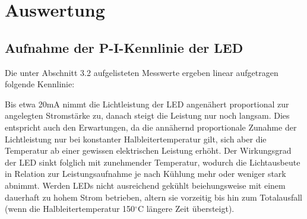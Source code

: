 \documentclass[bigchapter,colorback,accentcolor=tud4b,linedtoc,11pt]{tudreport}
\begin{document}
\chapter{Auswertung}
\section{Aufnahme der P-I-Kennlinie der LED}

Die unter Abschnitt 3.2 aufgelisteten Messwerte ergeben linear aufgetragen folgende Kennlinie:

\begin{center}
\begin{figure}[h]
\end{figure}
\end{center}

Bis etwa 20mA nimmt die Lichtleistung der LED angenähert proportional zur angelegten Stromstärke zu, danach steigt die Leistung nur noch langsam. Dies entspricht auch den Erwartungen, da die annähernd proportionale Zunahme der Lichtleistung nur bei konstanter Halbleitertemperatur gilt, sich aber die Temperatur ab einer gewissen elektrischen Leistung erhöht. Der Wirkungsgrad der LED sinkt folglich mit zunehmender Temperatur, wodurch die Lichtausbeute in Relation zur Leistungsaufnahme je nach Kühlung mehr oder weniger stark abnimmt. Werden LEDs nicht ausreichend gekühlt beiehungsweise mit einem dauerhaft zu hohem Strom betrieben, altern sie vorzeitig bis hin zum Totalausfall (wenn die Halbleitertemperatur 150$^{\circ}$C längere Zeit übersteigt).
\end{document}
